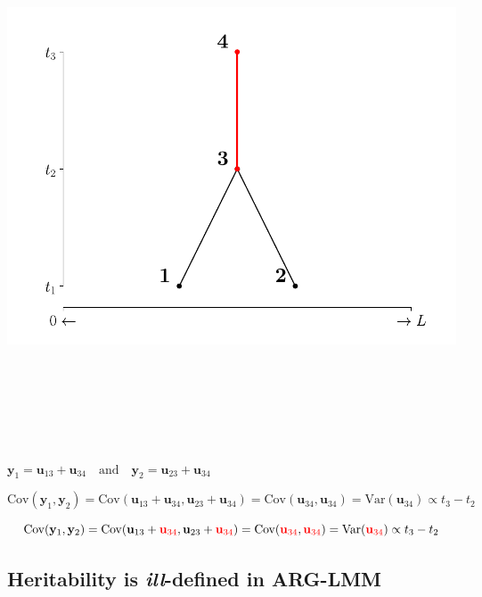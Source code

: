 \documentclass[
  letterpaper,
  DIV=11,
  numbers=noendperiod]{scrartcl}
\begin{document}
\begin{center}
\includegraphics[width=\linewidth,height=6.25in,keepaspectratio]{slides_files/mediabag/imgs/covariance-1.pdf}
\end{center}

\(\mathbf{y}_1 = \mathbf{u}_{13} + \mathbf{u}_{34} \quad \text{and} \quad \mathbf{y}_2 = \mathbf{u}_{23} + \mathbf{u}_{34}\)

\[
\mathrm{Cov}(\mathbf{y}_1, \mathbf{y}_2) = 
\mathrm{Cov}(\mathbf{u}_{13} + \mathbf{u}_{34}, \mathbf{u}_{23} + \mathbf{u}_{34}) =
\mathrm{Cov}(\mathbf{u}_{34}, \mathbf{u}_{34}) =
\mathrm{Var}(\mathbf{u}_{34}) \propto t_3 - t_2
\]

\[
\mathrm{Cov}(\mathbf{y}_1, \mathbf{y}_2) = 
\mathrm{Cov}(\mathbf{u}_{13} + \textcolor{red}{\mathbf{u}_{34}}, \mathbf{u}_{23} + \textcolor{red}{\mathbf{u}_{34}}) =
\mathrm{Cov}(\textcolor{red}{\mathbf{u}_{34}}, \textcolor{red}{\mathbf{u}_{34}}) =
\mathrm{Var}(\textcolor{red}{\mathbf{u}_{34}}) \propto t_3 - t_2
\]

\subsection{\texorpdfstring{Heritability is \emph{ill}-defined in
ARG-LMM}{Heritability is ill-defined in ARG-LMM}}\label{heritability-is-ill-defined-in-arg-lmm}
\end{document}
